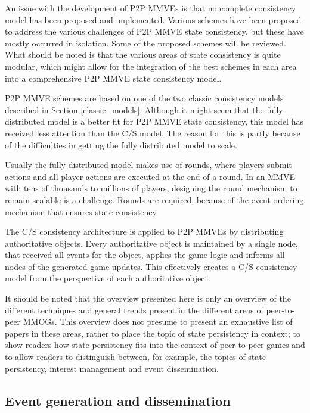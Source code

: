 An issue with the development of P2P MMVEs is that no complete consistency model has been proposed and implemented. Various schemes have been proposed to address the various challenges of P2P MMVE state consistency, but these have mostly occurred in isolation. Some of the proposed schemes will be reviewed. What should be noted is that the various areas of state consistency is quite modular, which might allow for the integration of the best schemes in each area into a comprehensive P2P MMVE state consistency model.

P2P MMVE schemes are based on one of the two classic consistency models described in Section \ref{classic_models}. Although it might seem that the fully distributed model is a better fit for P2P MMVE state consistency, this model has received less attention than the C/S model. The reason for this is partly because of the difficulties in getting the fully distributed model to scale.

Usually the fully distributed model makes use of rounds, where players submit actions and all player actions are executed at the end of a round. In an MMVE with tens of thousands to millions of players, designing the round mechanism to remain scalable is a challenge. Rounds are required, because of the event ordering mechanism that ensures state consistency.

The C/S consistency architecture is applied to P2P MMVEs by distributing authoritative objects. Every authoritative object is maintained by a single node, that received all events for the object, applies the game logic and informs all nodes of the generated game updates. This effectively creates a C/S consistency model from the perspective of each authoritative object.

It should be noted that the overview presented here is only an overview of the different techniques and general trends present in the different areas
of peer-to-peer MMOGs. This overview does not presume to present an exhaustive list of papers in these areas, rather to place the topic of state persistency in context; to show readers how state persistency fits into the context of peer-to-peer games and to allow readers to distinguish between, for example, the topics of state persistency, interest management and event dissemination.


\subsection{Event generation and dissemination}

